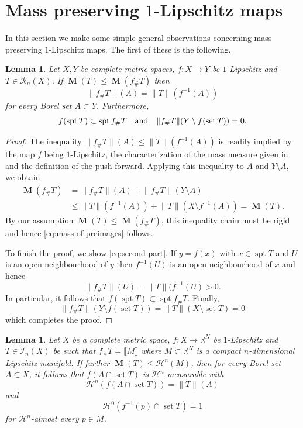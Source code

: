 \documentclass[reqno]{amsart}
\newtheorem{lemma}[theorem]{Lemma}
\numberwithin{equation}{section}
\newcommand{\R}{\mathbb{R}}
\newcommand{\spt}{\operatorname{spt}}
\newcommand{\norm}[1]{\lVert#1\rVert}
\newcommand{\bb}[1]{\llbracket #1\rrbracket}
\DeclareMathOperator{\mass}{\mathbf{M}}
\DeclareMathOperator{\set}{set}
\begin{document}
\section{Mass preserving \(1\)-Lipschitz maps}\label{sec:3}
In this section we make some simple general observations concerning mass preserving $1$-Lipschitz maps. The first of these is the following.
\begin{lemma}
\label{lem:mass-of-preimages}
Let $X,Y$ be complete metric spaces, $f\colon X\to Y$ be $1$-Lipschitz and $T\in \mathcal{R}_n(X)$. If $\mass(T)\leq \mass(f_\# T)$ then 
\begin{equation}
\label{eq:mass-of-preimages}
    \norm{f_\# T}(A)=\norm{T}(f^{-1}(A))
\end{equation}
for every Borel set $A\subset Y$. Furthermore,
\begin{equation}\label{eq:second-part}
f(\spt T)\subset \spt f_{\#}T \quad \textnormal{and}\quad \norm{f_{\#}T}(Y\setminus f(\set T))=0.
\end{equation}
\end{lemma}
\begin{proof}
The inequality $\norm{f_\# T}(A)\leq \norm{T}(f^{-1}(A))$ is readily implied by the map $f$ being $1$-Lipschitz, the characterization of the mass measure given in \cite[Proposition~2.7]{amb00} and the definition of the push-forward. 
Applying this inequality to $A$ and $Y\setminus A$, we obtain
\begin{align*}
\mass(f_\# T) &=\norm{f_\# T}(A)+ \norm{f_\# T}(Y \setminus A)\\
&\leq \norm{T}(f^{-1}(A))+ \norm{T}(X \setminus f^{-1}(A))=\mass (T).
\end{align*}
By our assumption $\mass (T)\leq \mass (f_\# T)$, this inequality chain must be rigid and hence \eqref{eq:mass-of-preimages} follows. 

To finish the proof, we show \eqref{eq:second-part}. If $y=f(x)$ with $x\in \spt T$ and $U$ is an open neighbourhood of $y$ then $f^{-1}(U)$ is an open neighbourhood of $x$ and hence \[
\norm{f_{\#}T}(U)=\norm{T}(f^{-1}(U)>0.
\]
In particular, it follows that $f(\spt T)\subset \spt f_{\#}T$. Finally,
\[\norm{f_{\#}T}(Y\setminus f(\set T))=\norm{T}(X\setminus \set T)=0\]
which completes the proof.
\end{proof}

\begin{lemma}
\label{lem:mass-of-images}
Let $X$ be a complete metric space, $f\colon X\to \mathbb{R}^N$ be $1$-Lipschitz and $T\in \mathcal{I}_n(X)$ be such that $f_\# T=\bb{M}$ where $M\subset \R^N$ is a compact $n$-dimensional Lipschitz manifold. If further $\mass (T)\leq \mathcal{H}^n(M)$, then for every Borel set $A\subset X$, it follows that \(f(A\cap \set T)\) is \(\mathcal{H}^n\)-measurable with
\begin{equation}
    \mathcal{H}^n(f(A\cap \set T))=\norm{T}(A)
\end{equation}
and 
\begin{equation}
    \mathcal{H}^0(f^{-1}(p)\cap \set T)=1
\end{equation}
for $\mathcal{H}^n$-almost every $p\in M$.
\end{lemma}
\end{document}
